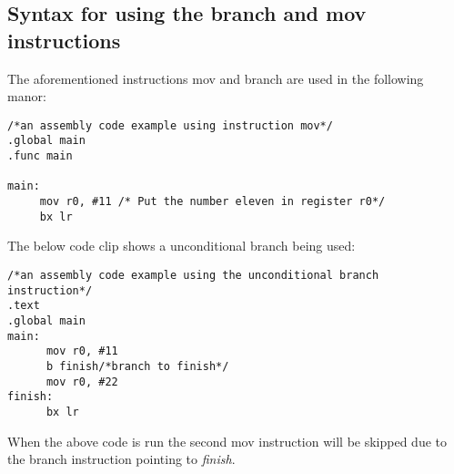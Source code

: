 \documentclass[11pt]{report}
\begin{document}
\subsection{Syntax for using the branch and mov instructions}
\begin{doublespace}
The aforementioned instructions mov and branch are used in the following manor: 
\end{doublespace}
\begin{lstlisting}
/*an assembly code example using instruction mov*/
.global main
.func main

main:
     mov r0, #11 /* Put the number eleven in register r0*/
     bx lr
\end{lstlisting}
\begin{doublespace}
The below code clip shows a unconditional branch being used:
\end{doublespace}
\begin{lstlisting}
/*an assembly code example using the unconditional branch instruction*/
.text
.global main
main:
      mov r0, #11
      b finish/*branch to finish*/
      mov r0, #22
finish:
      bx lr

\end{lstlisting}
\begin{doublespace}
When the above code is run the second mov instruction will be skipped due to the branch instruction pointing to \textit{finish}.
\end{doublespace}
\end{document}
